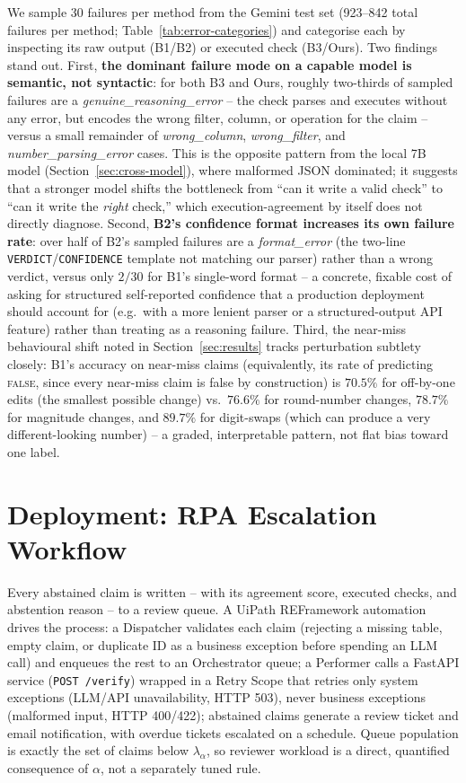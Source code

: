 \documentclass[journal]{IEEEtran}
\begin{document}
We sample 30 failures per method from the Gemini test set (923--842 total
failures per method; Table~\ref{tab:error-categories}) and categorise each
by inspecting its raw output (B1/B2) or executed check (B3/Ours). Two
findings stand out. First, \textbf{the dominant failure mode on a capable
model is semantic, not syntactic}: for both B3 and Ours, roughly
two-thirds of sampled failures are a \emph{genuine\_reasoning\_error} -- the
check parses and executes without any error, but encodes the wrong filter,
column, or operation for the claim -- versus a small remainder of
\emph{wrong\_column}, \emph{wrong\_filter}, and \emph{number\_parsing\_error}
cases. This is the opposite pattern from the local 7B model
(Section~\ref{sec:cross-model}), where malformed JSON dominated; it suggests
that a stronger model shifts the bottleneck from ``can it write a valid
check'' to ``can it write the \emph{right} check,'' which execution-agreement
by itself does not directly diagnose. Second, \textbf{B2's confidence format
increases its own failure rate}: over half of B2's sampled failures are a
\emph{format\_error} (the two-line \texttt{VERDICT}/\texttt{CONFIDENCE}
template not matching our parser) rather than a wrong verdict, versus only
$2/30$ for B1's single-word format -- a concrete, fixable cost of asking for
structured self-reported confidence that a production deployment should
account for (e.g.\ with a more lenient parser or a structured-output API
feature) rather than treating as a reasoning failure. Third, the near-miss
behavioural shift noted in Section~\ref{sec:results} tracks perturbation
subtlety closely: B1's accuracy on near-miss claims (equivalently, its rate
of predicting \textsc{false}, since every near-miss claim is false by
construction) is $70.5\%$ for off-by-one edits (the smallest possible
change) vs.\ $76.6\%$ for round-number changes, $78.7\%$ for magnitude
changes, and $89.7\%$ for digit-swaps (which can produce a very
different-looking number) -- a graded, interpretable pattern, not flat bias
toward one label.

\section{Deployment: RPA Escalation Workflow}
\label{sec:deployment}

Every abstained claim is written -- with its agreement score, executed
checks, and abstention reason -- to a review queue. A UiPath REFramework
automation drives the process: a Dispatcher validates each claim (rejecting
a missing table, empty claim, or duplicate ID as a business exception before
spending an LLM call) and enqueues the rest to an Orchestrator queue; a
Performer calls a FastAPI service (\texttt{POST /verify}) wrapped in a Retry
Scope that retries only system exceptions (LLM/API unavailability, HTTP 503),
never business exceptions (malformed input, HTTP 400/422); abstained claims
generate a review ticket and email notification, with overdue tickets
escalated on a schedule. Queue population is exactly the set of claims below
$\lambda_\alpha$, so reviewer workload is a direct, quantified consequence of
$\alpha$, not a separately tuned rule.
\end{document}
